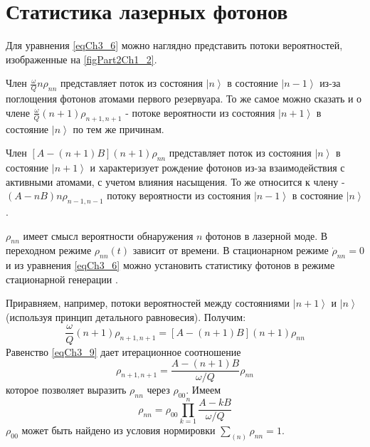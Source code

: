 \section{Статистика лазерных фотонов}
Для уравнения \eqref{eqCh3_6} можно наглядно представить потоки
вероятностей, изображенные на \autoref{figPart2Ch1_2}. 



Член $\frac{\omega}{Q} n \rho_{nn}$ представляет поток из состояния
$\left|n\right>$ в состояние $\left|n - 1\right>$ из-за 
поглощения фотонов атомами первого резервуара. То же самое можно
сказать и о члене $\frac{\omega}{Q} \left(n + 1\right) \rho_{n + 1, n
  + 1}$ - потоке вероятности из состояния $\left|n + 1\right>$ в состояние
$\left|n\right>$ по тем же причинам. 

Член $\left[A - \left(n + 1\right) B\right]\left(n + 1\right)
\rho_{nn}$ представляет поток из 
состояния $\left|n\right>$ в состояние  
$\left|n + 1\right>$ и характеризует рождение фотонов из-за
взаимодействия с активными атомами, с учетом влияния насыщения. То же
относится к члену   - $\left(A - n B\right)n \rho_{n - 1, n - 1}$
потоку вероятности из состояния $\left|n - 1\right>$ в состояние
$\left|n\right>$.  

$\rho_{nn}$ имеет смысл вероятности обнаружения $n$ фотонов в лазерной
моде. В переходном режиме $\rho_{nn}\left(t\right)$ зависит от
времени. В стационарном режиме $\dot{\rho}_{nn} = 0$
и из уравнения \autoref {eqCh3_6} можно установить статистику фотонов в режиме
стационарной генерации \cite{bScally1974}. 

Приравняем, например, потоки вероятностей между состояниями 
$\left|n + 1\right>$ и $\left|n\right>$
(используя принцип детального равновесия). Получим: 
\begin{equation}
\frac{\omega}{Q}\left(n + 1\right)\rho_{n + 1, n + 1} =
\left[A - \left(n + 1\right)B\right]\left(n + 1\right)\rho_{nn}
\label{eqCh3_9}
\end{equation}
Равенство \eqref{eqCh3_9} дает итерационное соотношение
\begin{equation}
\rho_{n + 1, n + 1} = 
\frac{A - \left(n + 1\right)B}{\omega/Q} \rho_{nn}
\label{eqCh3_10}
\end{equation}
которое позволяет выразить $\rho_{nn}$ через $\rho_{00}$.  Имеем
\begin{equation}
\rho_{nn} = \rho_{00}\prod_{k = 1}^n
\frac{A - k B}{\omega/Q} 
\label{eqCh3_11}
\end{equation}
$\rho_{00}$ может быть найдено из условия нормировки
$\sum_{(n)}\rho_{nn} = 1$.

